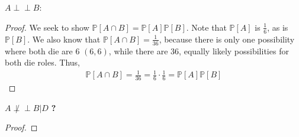 \documentclass{article}
\newcommand{\how}[1]{\colorbox{BurntOrange}{\textbf{#1}}}
\newcommand{\indep}{\perp \!\!\! \perp}
\begin{document}
\subsection{}
$A \indep B$:
\begin{proof}
We seek to show $\mathbb{P}[A \cap B] = \mathbb{P}[A] \mathbb{P}[B]$. Note that $\mathbb{P}[A]$ is $\frac{1}{6}$, as is $\mathbb{P}[B]$. We also know that $\mathbb{P}[A \cap B] = \frac{1}{36}$, because there is only one possibility where both die are 6 $(6, 6)$, while there are 36, equally likely possibilities for both die roles. Thus,
\begin{align}
    \mathbb{P}[A \cap B] = \frac{1}{36} = \frac{1}{6} \cdot \frac{1}{6} = \mathbb{P}[A] \mathbb{P}[B]
\end{align}
\end{proof}

$A \not \indep B | D$ \how{?}
\begin{proof}

\end{proof}


\printbibliography
\end{document}
